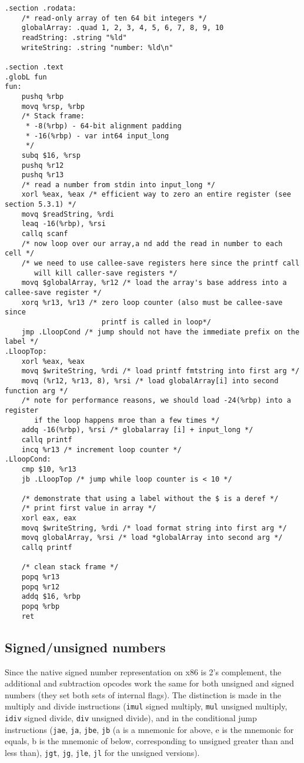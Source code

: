 \documentclass[11pt]{article}
\begin{document}
\begin{lstlisting}
.section .rodata:
    /* read-only array of ten 64 bit integers */
    globalArray: .quad 1, 2, 3, 4, 5, 6, 7, 8, 9, 10
    readString: .string "%ld"
    writeString: .string "number: %ld\n"

.section .text
.globL fun
fun:
    pushq %rbp
    movq %rsp, %rbp
    /* Stack frame:
     * -8(%rbp) - 64-bit alignment padding
     * -16(%rbp) - var int64 input_long
     */
    subq $16, %rsp
    pushq %r12
    pushq %r13
    /* read a number from stdin into input_long */
    xorl %eax, %eax /* efficient way to zero an entire register (see section 5.3.1) */
    movq $readString, %rdi
    leaq -16(%rbp), %rsi
    callq scanf
    /* now loop over our array,a nd add the read in number to each cell */
    /* we need to use callee-save registers here since the printf call
       will kill caller-save registers */
    movq $globalArray, %r12 /* load the array's base address into a callee-save register */
    xorq %r13, %r13 /* zero loop counter (also must be callee-save since
                       printf is called in loop*/
    jmp .LloopCond /* jump should not have the immediate prefix on the label */
.LloopTop:
    xorl %eax, %eax
    movq $writeString, %rdi /* load printf fmtstring into first arg */
    movq (%r12, %r13, 8), %rsi /* load globalArray[i] into second function arg */
    /* note for performance reasons, we should load -24(%rbp) into a register
       if the loop happens mroe than a few times */
    addq -16(%rbp), %rsi /* globalarray [i] + input_long */
    callq printf
    incq %r13 /* increment loop counter */
.LloopCond:
    cmp $10, %r13
    jb .LloopTop /* jump while loop counter is < 10 */

    /* demonstrate that using a label without the $ is a deref */
    /* print first value in array */
    xorl eax, eax
    movq $writeString, %rdi /* load format string into first arg */
    movq globalArray, %rsi /* load *globalArray into second arg */
    callq printf

    /* clean stack frame */
    popq %r13
    popq %r12
    addq $16, %rbp
    popq %rbp
    ret
\end{lstlisting}

\subsection{Signed/unsigned numbers}

Since the native signed number representation on x86 is 2's complement, the additional and
subtraction opcodes work the same for both unsigned and signed numbers (they set both sets
of internal flags). The distinction is made in the multiply and divide instructions
(\texttt{imul} signed multiply, \texttt{mul} unsigned multiply, \texttt{idiv} signed
divide, \texttt{div} unsigned divide), and in the conditional jump instructions
(\texttt{jae}, \texttt{ja}, \texttt{jbe}, \texttt{jb} (a is a mnemonic for above, e is the
mnemonic for equals, b is the mnemonic of below, corresponding to unsigned greater than
and less than), \texttt{jgt}, \texttt{jg}, \texttt{jle}, \texttt{jl} for the unsigned
versions).
\end{document}
